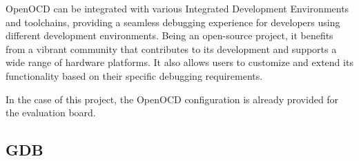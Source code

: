 OpenOCD can be integrated with various Integrated Development Environments and toolchains, providing a seamless debugging experience for developers using different development environments. Being an open-source project, it benefits from a vibrant community that contributes to its development and supports a wide range of hardware platforms. It also allows users to customize and extend its functionality based on their specific debugging requirements.

In the case of this project, the OpenOCD configuration is already provided for the evaluation board.\cite{OpenocdConfigFile}

\subsection{GDB}


